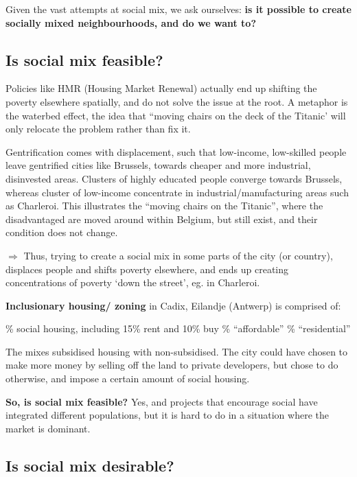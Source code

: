 \documentclass{article}
\begin{document}
Given the vast attempts at social mix, we ask ourselves: \textbf{is it possible to create socially mixed neighbourhoods, and do we want to?}

\subsection{Is social mix feasible?}

Policies like HMR (Housing Market Renewal) actually end up shifting the poverty elsewhere spatially, and do not solve the issue at the root. A metaphor is the waterbed effect, the idea that ``moving chairs on the deck of the Titanic' will only relocate the problem rather than fix it.

Gentrification comes with displacement, such that low-income, low-skilled people leave gentrified cities like Brussels, towards cheaper and more industrial, disinvested areas. Clusters of highly educated people converge towards Brussels, whereas cluster of low-income  concentrate in industrial/manufacturing areas such as Charleroi.
This illustrates the ``moving chairs on the Titanic'', where the disadvantaged are moved around within Belgium, but still exist, and their condition does not change. 

$\Rightarrow$ Thus, trying to create a social mix in some parts of the city (or country), displaces people and shifts poverty elsewhere, and ends up creating concentrations of poverty `down the street', eg. in Charleroi.

\textbf{Inclusionary housing/ zoning} in Cadix, Eilandje (Antwerp) is comprised of:
\begin{outline}
	\% social housing, including 15\% rent and 10\% buy
	\% ``affordable''
	\% ``residential''
\end{outline}

The mixes subsidised housing with non-subsidised. The city could have chosen to make more money by selling off the land to private developers, but chose to do otherwise, and impose a certain amount of social housing.

\textbf{So, is social mix feasible?} Yes, and projects that encourage social have integrated different populations, but it is hard to do in a situation where the market is dominant.

\subsection{Is social mix desirable?}
\end{document}
